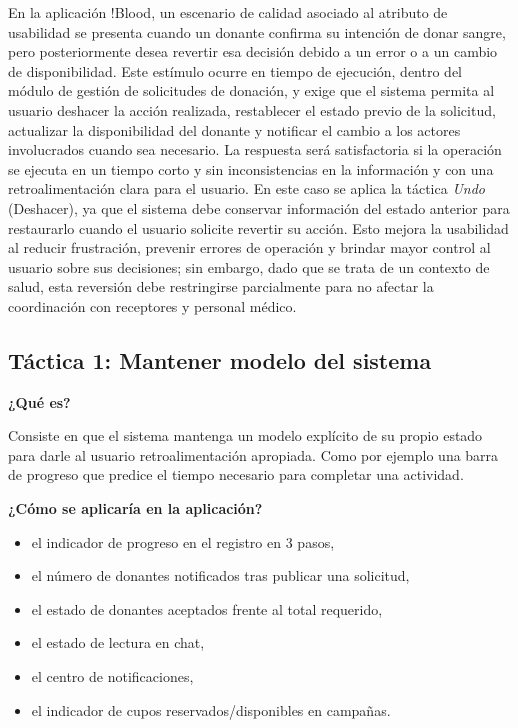 En la aplicación !Blood, un escenario de calidad asociado al atributo de usabilidad se presenta cuando un donante confirma su intención de donar sangre, pero posteriormente desea revertir esa decisión debido a un error o a un cambio de disponibilidad. Este estímulo ocurre en tiempo de ejecución, dentro del módulo de gestión de solicitudes de donación, y exige que el sistema permita al usuario deshacer la acción realizada, restablecer el estado previo de la solicitud, actualizar la disponibilidad del donante y notificar el cambio a los actores involucrados cuando sea necesario. La respuesta será satisfactoria si la operación se ejecuta en un tiempo corto y sin inconsistencias en la información y con una retroalimentación clara para el usuario. En este caso se aplica la táctica \textit{Undo} (Deshacer), ya que el sistema debe conservar información del estado anterior para restaurarlo cuando el usuario solicite revertir su acción. Esto mejora la usabilidad al reducir frustración, prevenir errores de operación y brindar mayor control al usuario sobre sus decisiones; sin embargo, dado que se trata de un contexto de salud, esta reversión debe restringirse parcialmente para no afectar la coordinación con receptores y personal médico.

\subsection{Táctica 1: Mantener modelo del sistema}

\noindent\textbf{¿Qué es?}

Consiste en que el sistema mantenga un modelo explícito de su propio estado para darle al usuario retroalimentación apropiada. Como por ejemplo una barra de progreso que predice el tiempo necesario para completar una actividad.

\medskip
\noindent\textbf{¿Cómo se aplicaría en la aplicación?}

\begin{itemize}
    \item el indicador de progreso en el registro en 3 pasos,
    \item el número de donantes notificados tras publicar una solicitud,
    \item el estado de donantes aceptados frente al total requerido,
    \item el estado de lectura en chat,
    \item el centro de notificaciones,
    \item el indicador de cupos reservados/disponibles en campañas.
\end{itemize}

